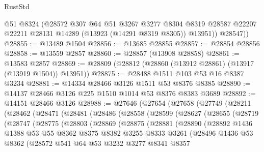 \begin{lexlean}{RustStd}
\begin{coremodule}
          @51
          @8324
          (@28572
            @307
            @64
            @51
            @3267
            @3277
            @8304
            @8319
            @28587
            @22207
            @22211
            @28131
            @14289
            (@13923 (@14291 @8319 @8305))
            @13951))
        @28547))
@28855 := @13489 @1504
@28856 := @13685 @28855
@28857 := @28854 @28856
@28858 := @13559 @2857
@28860 := @28857 (@13908 @28858)
@28861 := @13583 @2857
@28869 := @28809 (@28812 (@28860 (@13912 @28861) (@13917 (@13919 @1504)) @13951))
@28875 := @28488 @1511 @103 @53 @16 @8387 @3234
@28881 := @14334 @28466 @3126 @1511 @53 @8376 @8385
@28890 := @14137 @28466 @3126 @225 @1510 @1014 @53 @8376 @8383 @3689
@28892 := @14151 @28466 @3126
@28988 := @27646
    (@27654
      (@27658
        (@27749
          (@28211
            (@28462
              (@28471
                (@28481
                  (@28486
                    (@28558
                      (@28599
                        (@28627
                          (@28655
                            (@28719
                              (@28747
                                (@28775
                                  (@28803
                                    (@28869
                                      (@28875
                                        (@28881
                                          (@28890
                                            (@28892
                                              @1436
                                              @1388
                                              @53
                                              @55
                                              @8362
                                              @8375
                                              @8382
                                              @3255
                                              @8333
                                              @3261
                                              (@28496
                                                @1436
                                                @53
                                                @8362
                                                (@28572
                                                  @541
                                                  @64
                                                  @53
                                                  @3232
                                                  @3277
                                                  @8341
                                                  @8357

\end{coremodule}
\end{lexlean}
